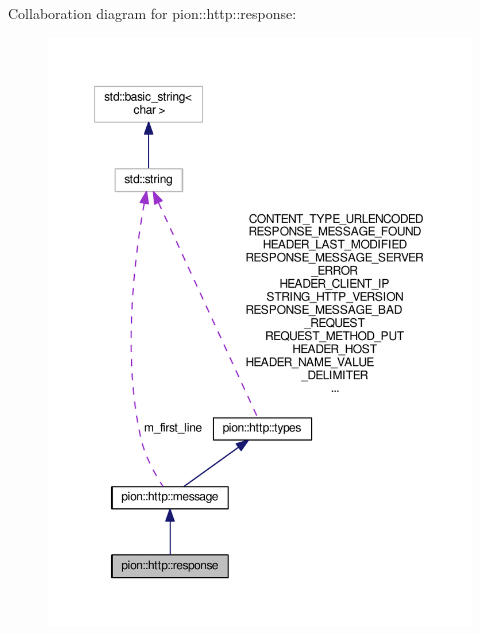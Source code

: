Collaboration diagram for pion\-:\-:http\-:\-:response\-:
\nopagebreak
\begin{figure}[H]
\begin{center}
\leavevmode
\includegraphics[width=350pt]{classpion_1_1http_1_1response__coll__graph}
\end{center}
\end{figure}
